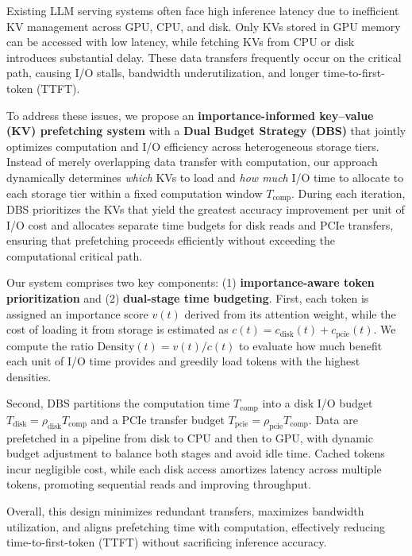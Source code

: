 Existing LLM serving systems often face high inference latency due to inefficient KV management across GPU, CPU, and disk. 
Only KVs stored in GPU memory can be accessed with low latency, while fetching KVs from CPU or disk introduces substantial delay. 
These data transfers frequently occur on the critical path, causing I/O stalls, bandwidth underutilization, and longer time-to-first-token (TTFT). 


To address these issues, we propose an \textbf{importance-informed key–value (KV) prefetching system} with a \textbf{Dual Budget Strategy (DBS)} that jointly optimizes computation and I/O efficiency across heterogeneous storage tiers. 
Instead of merely overlapping data transfer with computation, our approach dynamically determines \emph{which} KVs to load and \emph{how much} I/O time to allocate to each storage tier within a fixed computation window $T_{\text{comp}}$. 
During each iteration, DBS prioritizes the KVs that yield the greatest accuracy improvement per unit of I/O cost and allocates separate time budgets for disk reads and PCIe transfers, ensuring that prefetching proceeds efficiently without exceeding the computational critical path.

Our system comprises two key components: (1) \textbf{importance-aware token prioritization} and (2) \textbf{dual-stage time budgeting}.  
First, each token is assigned an importance score $v(t)$ derived from its attention weight, while the cost of loading it from storage is estimated as $c(t) = c_{\text{disk}}(t) + c_{\text{pcie}}(t)$.  
We compute the ratio $\text{Density}(t) = v(t)/c(t)$ to evaluate how much benefit each unit of I/O time provides and greedily load tokens with the highest densities.  

Second, DBS partitions the computation time $T_{\text{comp}}$ into a disk I/O budget $T_{\text{disk}} = \rho_{\text{disk}}T_{\text{comp}}$ and a PCIe transfer budget $T_{\text{pcie}} = \rho_{\text{pcie}}T_{\text{comp}}$.  
Data are prefetched in a pipeline from disk to CPU and then to GPU, with dynamic budget adjustment to balance both stages and avoid idle time.  
Cached tokens incur negligible cost, while each disk access amortizes latency across multiple tokens, promoting sequential reads and improving throughput.  

Overall, this design minimizes redundant transfers, maximizes bandwidth utilization, and aligns prefetching time with computation, effectively reducing time-to-first-token (TTFT) without sacrificing inference accuracy.




